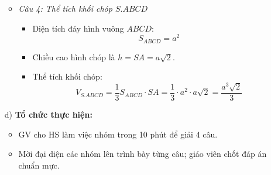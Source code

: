 \documentclass[12pt, a4paper]{article}
\begin{document}
\begin{itemize}[leftmargin=1.2cm]
\begin{itemize}[leftmargin=0.6cm]
        \item \textit{Câu 4: Thể tích khối chóp $S.ABCD$}
        \begin{itemize}
            \item Diện tích đáy hình vuông $ABCD$:
            $$S_{ABCD} = a^2$$
            \item Chiều cao hình chóp là $h = SA = a\sqrt{2}$.
            \item Thể tích khối chóp:
            $$V_{S.ABCD} = \dfrac{1}{3} S_{ABCD} \cdot SA = \dfrac{1}{3} \cdot a^2 \cdot a\sqrt{2} = \dfrac{a^3\sqrt{2}}{3}$$
        \end{itemize}
    \end{itemize}

    \item[d)] \textbf{Tổ chức thực hiện:}
    \begin{itemize}[leftmargin=0.6cm]
        \item GV cho HS làm việc nhóm trong 10 phút để giải 4 câu.
        \item Mời đại diện các nhóm lên trình bày từng câu; giáo viên chốt đáp án chuẩn mực.
    \end{itemize}
\end{itemize}
\end{document}
